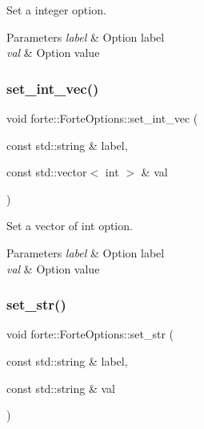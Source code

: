 Set a integer option. 


\begin{DoxyParams}{Parameters}
{\em label} & Option label \\
\hline
{\em val} & Option value \\
\hline
\end{DoxyParams}
\mbox{\label{classforte_1_1_forte_options_a2bb791d7d4f713d339d4f42a40ef6cb5}} 
\subsubsection{\texorpdfstring{set\+\_\+int\+\_\+vec()}{set\_int\_vec()}}
{\footnotesize\ttfamily void forte\+::\+Forte\+Options\+::set\+\_\+int\+\_\+vec (\begin{DoxyParamCaption}\item[{const std\+::string \&}]{label,  }\item[{const std\+::vector$<$ int $>$ \&}]{val }\end{DoxyParamCaption})}



Set a vector of int option. 


\begin{DoxyParams}{Parameters}
{\em label} & Option label \\
\hline
{\em val} & Option value \\
\hline
\end{DoxyParams}
\mbox{\label{classforte_1_1_forte_options_a6f71291bb82d61dad15bda789e3a09e7}} 
\subsubsection{\texorpdfstring{set\+\_\+str()}{set\_str()}}
{\footnotesize\ttfamily void forte\+::\+Forte\+Options\+::set\+\_\+str (\begin{DoxyParamCaption}\item[{const std\+::string \&}]{label,  }\item[{const std\+::string \&}]{val }\end{DoxyParamCaption})}



